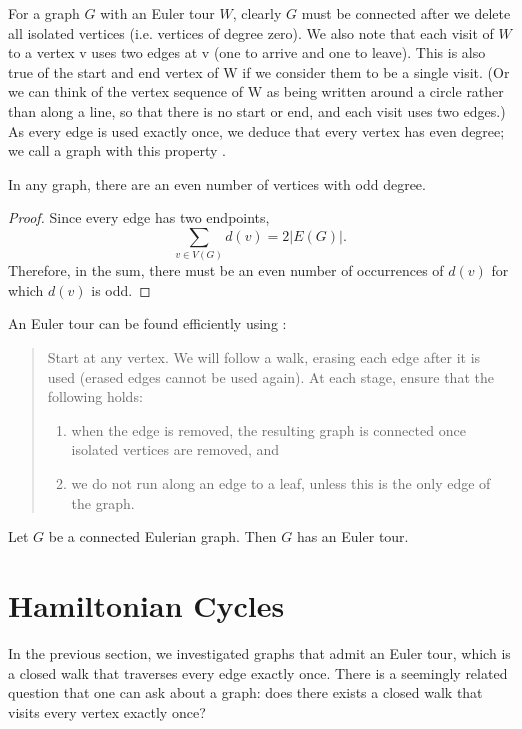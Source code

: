 For a graph $G$ with an Euler tour $W$, clearly $G$ must be connected after we delete all isolated vertices (i.e. vertices of degree zero). We also note that each visit of $W$ to a vertex v uses two edges at v (one to arrive and one to leave). This is also true of the start and end vertex of W if we consider them to be a single visit. (Or we can think of the vertex sequence of W as being written around a circle rather than along a line, so that there is no start or end, and each visit uses two edges.) As every edge is used exactly once, we deduce that every vertex has even degree; we call a graph with this property .

\begin{lemma}
In any graph, there are an even number of vertices with odd degree.
\end{lemma}

\begin{proof}
Since every edge has two endpoints,
\[\sum_{v\in V(G)}d(v)=2|E(G)|.\]
Therefore, in the sum, there must be an even number of occurrences of $d(v)$ for which $d(v)$ is odd.
\end{proof}

An Euler tour can be found efficiently using :
\begin{quote}
Start at any vertex. We will follow a walk, erasing each edge after it is used (erased edges cannot be used again). At each stage, ensure that the following holds:
\begin{enumerate}[label=(\roman*)]
\item when the edge is removed, the resulting graph is connected once isolated vertices are removed, and
\item we do not run along an edge to a leaf, unless this is the only edge of the graph.
\end{enumerate}
\end{quote}

\begin{theorem}[Euler]
Let $G$ be a connected Eulerian graph. Then $G$ has an Euler tour.
\end{theorem}

\section{Hamiltonian Cycles}
In the previous section, we investigated graphs that admit an Euler tour, which is a closed walk that traverses every edge exactly once. There is a seemingly related question that one can ask about a graph: does there exists a closed walk that visits every vertex exactly once?

